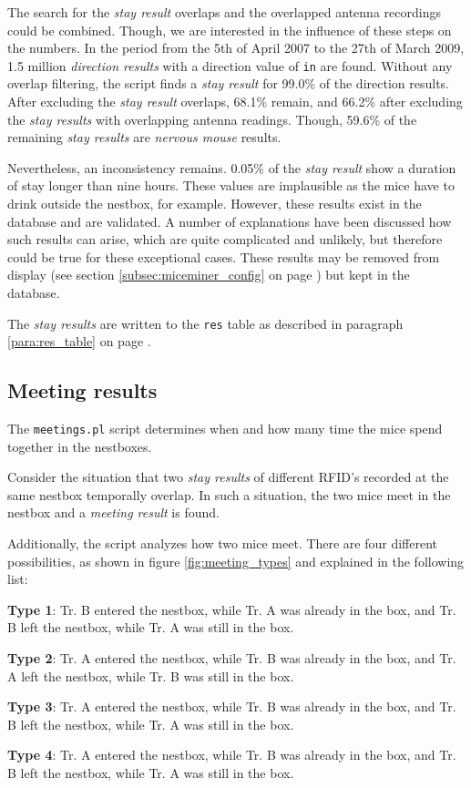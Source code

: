 The search for the \textit{stay result} overlaps and the overlapped antenna recordings could be combined. Though, we are interested in the influence of these steps on the numbers. In the period from the 5th of April 2007 to the 27th of March 2009, 1.5 million \textit{direction results} with a direction value of \lstinline|in| are found. Without any overlap filtering, the script finds a \textit{stay result} for 99.0\% of the direction results. After excluding the \textit{stay result} overlaps, 68.1\% remain, and 66.2\% after excluding the \textit{stay results} with overlapping antenna readings. Though, 59.6\% of the remaining \textit{stay results} are \textit{nervous mouse} results.

Nevertheless, an inconsistency remains. 0.05\% of the \textit{stay result} show a duration of stay longer than nine hours. These values are implausible as the mice have to drink outside the nestbox, for example. However, these results exist in the database and are validated. A number of explanations have been discussed how such results can arise, which are quite complicated and unlikely, but therefore could be true for these exceptional cases. These results may be removed from display (see section \ref{subsec:miceminer_config} on page \pageref{subsec:miceminer_config}) but kept in the database.     

The \textit{stay results} are written to the \lstinline|res| table as described in paragraph \ref{para:res_table} on page \pageref{para:res_table}.

\subsection{Meeting results}
\label{subsec:meetingres}

The \lstinline|meetings.pl| script determines when and how many time the mice spend together in the nestboxes. 

Consider the situation that two \textit{stay results} of different RFID's recorded at the same nestbox temporally overlap. In such a situation, the two mice meet in the nestbox and a \textit{meeting result} is found.

Additionally, the script analyzes how two mice meet. There are four different possibilities, as shown in figure \ref{fig:meeting_types} and explained in the following list:

\begin{mydesc}
\label{list:meeting_types}
\item \textbf{Type 1}: Tr. B entered the nestbox, while Tr. A was already in the box, and Tr. B left the nestbox, while Tr. A was still in the box. 
\item \textbf{Type 2}: Tr. A entered the nestbox, while Tr. B was already in the box, and Tr. A left the nestbox, while Tr. B was still in the box. 
\item \textbf{Type 3}: Tr. A entered the nestbox, while Tr. B was already in the box, and Tr. B left the nestbox, while Tr. A was still in the box. 
\item \textbf{Type 4}: Tr. A entered the nestbox, while Tr. B was already in the box, and Tr. B left the nestbox, while Tr. A was still in the box. 
\end{mydesc}

